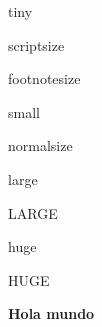 \documentclass{book}
\begin{document}
{\tiny tiny}

{\scriptsize scriptsize}

{\footnotesize footnotesize}

{\small small}

{\normalsize normalsize}

{\large large}

{\Large LARGE}

{\huge huge}

{\Huge HUGE}

\textbf{\Large Hola mundo}
\end{document}
